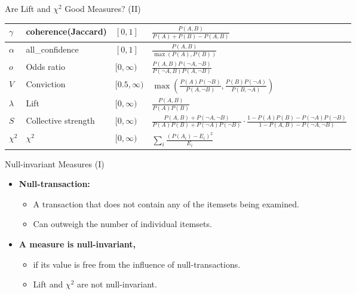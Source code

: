 \begin{frame}{Are Lift and $\chi^2$ Good Measures? (II)}
{\begin{tabular}{|m{}<{\centering}|m{}<{\centering}|m{}<{\centering}|m{}<{\centering}|}
			\hline
			$\gamma$        & coherence(Jaccard)  & $[0,1]$        & $\frac{P(A,B)}{P(A)+P(B)-P(A,B)}$                                                                                                           \\
			\hline
			$\alpha$        & all\_confidence     & $[0,1]$        & $\frac{P(A,B)}{\max(P(A),P(B))}$                                                                                                            \\
			\hline
			$o$             & Odds ratio          & $[0,\infty)$   & $\frac{P(A,B)P(\neg A, \neg B)}{P(\neg A,B) P(A,\neg B)}$                                                                                   \\
			\hline
			$V$             & Conviction          & $[0.5,\infty)$ & $\max(\frac{P(A)P(\neg B)}{P(A,\neg B)},\frac{P(B)P(\neg A)}{P(B,\neg A)})$                                                                 \\
			\hline
			$\lambda$       & Lift                & $[0, \infty)$  & $\frac{P(A,B)}{P(A)P(B)}$                                                                                                                   \\
			\hline
			$S$             & Collective strength & $[0,\infty)$   & $\frac{P(A,B) + P(\neg A, \neg B)}{P(A)P(B) + P(\neg A) P(\neg B)} \cdot \frac{1-P(A)P(B)-P(\neg A) P(\neg B)}{1-P(A,B)-P(\neg A, \neg B)}$ \\
			\hline
			$\chi^2$        & $\chi^2$            & $[0,\infty)$   & $\sum_i \frac{(P(A_i)-E_i)^2}{E_i}$                                                                                                         \\
			\hline
		\end{tabular}
	}
\end{frame}

\begin{frame}{Null-invariant Measures (I)}
	\begin{itemize}
		\item \textbf{\color{airforceblue}Null-transaction:}
		      \begin{itemize}
			      \item A transaction that does not contain any of the
			            itemsets being examined.
			      \item Can outweigh the number of individual itemsets.
		      \end{itemize}
		\item \textbf{\color{airforceblue}A measure is null-invariant,}
		      \begin{itemize}
			      \item if its value is free from the influence of
			            null-transactions.
			      \item Lift and $\chi^2$ are not null-invariant.
		      \end{itemize}
	\end{itemize}
\end{frame}

